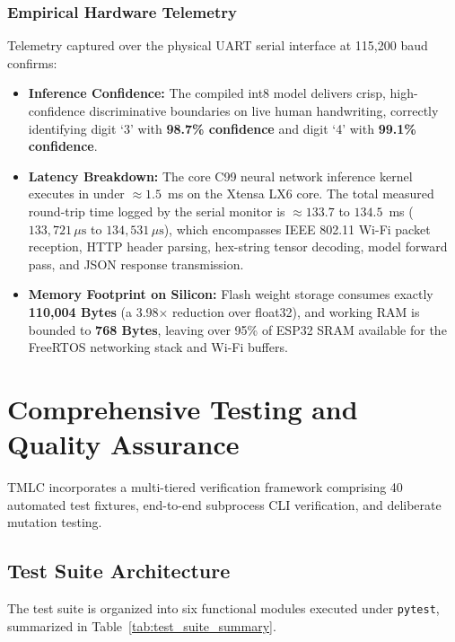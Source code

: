 \documentclass[11pt,a4paper]{article}
\begin{document}
\subsubsection{Empirical Hardware Telemetry}
Telemetry captured over the physical UART serial interface at 115,200 baud confirms:
\begin{itemize}
    \item \textbf{Inference Confidence:} The compiled int8 model delivers crisp, high-confidence discriminative boundaries on live human handwriting, correctly identifying digit `3' with \textbf{98.7\% confidence} and digit `4' with \textbf{99.1\% confidence}.
    \item \textbf{Latency Breakdown:} The core C99 neural network inference kernel executes in under $\approx 1.5$~ms on the Xtensa LX6 core. The total measured round-trip time logged by the serial monitor is $\approx 133.7$ to $134.5$~ms ($133,721\,\mu\text{s}$ to $134,531\,\mu\text{s}$), which encompasses IEEE 802.11 Wi-Fi packet reception, HTTP header parsing, hex-string tensor decoding, model forward pass, and JSON response transmission.
    \item \textbf{Memory Footprint on Silicon:} Flash weight storage consumes exactly \textbf{110,004 Bytes} (a 3.98$\times$ reduction over float32), and working RAM is bounded to \textbf{768 Bytes}, leaving over 95\% of ESP32 SRAM available for the FreeRTOS networking stack and Wi-Fi buffers.
\end{itemize}

\section{Comprehensive Testing and Quality Assurance}
\label{sec:qa}

TMLC incorporates a multi-tiered verification framework comprising 40 automated test fixtures, end-to-end subprocess CLI verification, and deliberate mutation testing.

\subsection{Test Suite Architecture}
The test suite is organized into six functional modules executed under \texttt{pytest}, summarized in Table~\ref{tab:test_suite_summary}.
\end{document}
